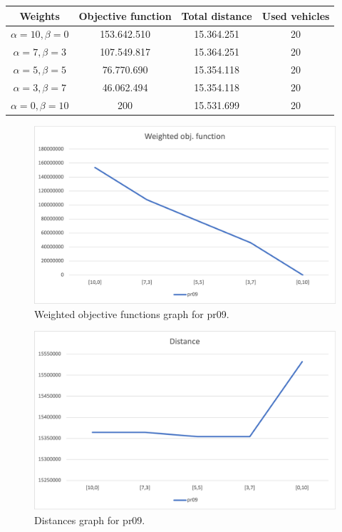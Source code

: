 {
\renewcommand{\arraystretch}{2}
\begin{longtable}[h]{| c | c | c | c |}
    \hline
    \textbf{Weights} & \textbf{Objective function} & \textbf{Total distance} & \textbf{Used vehicles} \\
    \hline
    \endhead
    $\alpha = 10, \beta = 0$ & 153.642.510 & 15.364.251 & 20 \\
    \hline
    $\alpha = 7, \beta = 3$  & 107.549.817 & 15.364.251 & 20 \\
    \hline
    $\alpha = 5, \beta = 5$  &  76.770.690 & 15.354.118 & 20 \\
    \hline
    $\alpha = 3, \beta = 7$  &  46.062.494 & 15.354.118 & 20 \\
    \hline
    $\alpha = 0, \beta = 10$ &         200 & 15.531.699 & 20 \\
    \hline
\end{longtable}
}
\begin{figure}[H]
    \centering
    \includegraphics[height=0.25\textheight]{../graphs/pr09-wobjf.png}
    \caption{Weighted objective functions graph for pr09.}
\end{figure}

\begin{figure}[H]
    \centering
    \includegraphics[height=0.25\textheight]{../graphs/pr09-distance.png}
    \caption{Distances graph for pr09.}
\end{figure}

